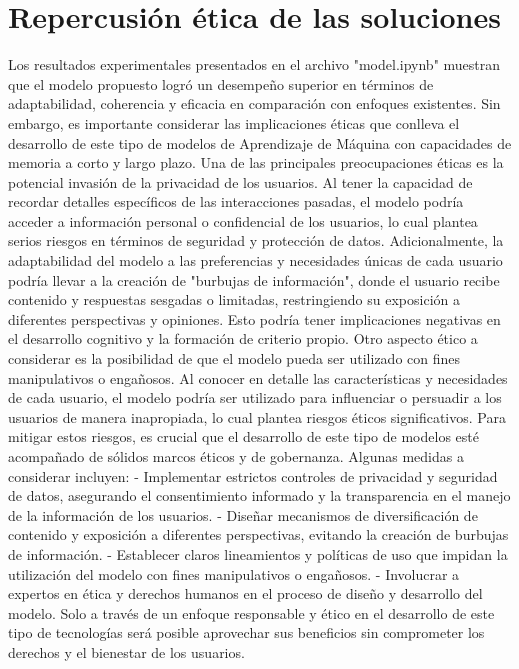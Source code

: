 \documentclass{article}
\begin{document}
\section{Repercusión ética de las soluciones}
Los resultados experimentales presentados en el archivo "model.ipynb" muestran que el 
modelo propuesto logró un desempeño superior en términos de adaptabilidad, coherencia y 
eficacia en comparación con enfoques existentes. Sin embargo, es importante considerar las 
implicaciones éticas que conlleva el desarrollo de este tipo de modelos de Aprendizaje de 
Máquina con capacidades de memoria a corto y largo plazo.
Una de las principales preocupaciones éticas es la potencial invasión de la privacidad de los 
usuarios. Al tener la capacidad de recordar detalles específicos de las interacciones pasadas, el 
modelo podría acceder a información personal o confidencial de los usuarios, lo cual plantea 
serios riesgos en términos de seguridad y protección de datos.
Adicionalmente, la adaptabilidad del modelo a las preferencias y necesidades únicas de cada 
usuario podría llevar a la creación de "burbujas de información", donde el usuario recibe 
contenido y respuestas sesgadas o limitadas, restringiendo su exposición a diferentes 
perspectivas y opiniones. Esto podría tener implicaciones negativas en el desarrollo cognitivo y 
la formación de criterio propio.
Otro aspecto ético a considerar es la posibilidad de que el modelo pueda ser utilizado con fines 
manipulativos o engañosos. Al conocer en detalle las características y necesidades de cada 
usuario, el modelo podría ser utilizado para influenciar o persuadir a los usuarios de manera 
inapropiada, lo cual plantea riesgos éticos significativos.
Para mitigar estos riesgos, es crucial que el desarrollo de este tipo de modelos esté 
acompañado de sólidos marcos éticos y de gobernanza. Algunas medidas a considerar incluyen:
- Implementar estrictos controles de privacidad y seguridad de datos, asegurando el 
consentimiento informado y la transparencia en el manejo de la información de los usuarios.
- Diseñar mecanismos de diversificación de contenido y exposición a diferentes perspectivas, 
evitando la creación de burbujas de información.
- Establecer claros lineamientos y políticas de uso que impidan la utilización del modelo con 
fines manipulativos o engañosos.
- Involucrar a expertos en ética y derechos humanos en el proceso de diseño y desarrollo del 
modelo.
Solo a través de un enfoque responsable y ético en el desarrollo de este tipo de tecnologías será 
posible aprovechar sus beneficios sin comprometer los derechos y el bienestar de los usuarios.
\end{document}
